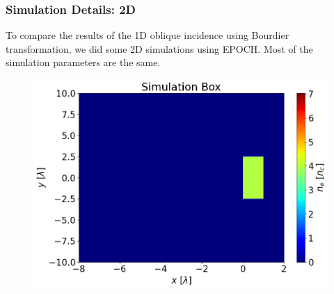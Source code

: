 \documentclass{beamer}
\begin{document}
\begin{frame}
    \frametitle{Simulation Details: 2D}
    \small
    To compare the results of the 1D oblique incidence using Bourdier transformation, we did some 2D simulations using EPOCH. Most of the simulation parameters are the same.
    \begin{minipage}[t]{0.64\linewidth}
        \begin{figure}
            \centering
            \includegraphics[width=1.0\textwidth, height=0.62\textheight]{images/2dbox.png}
            \label{fig:2dbox}
        \end{figure}
    \end{minipage}

\end{frame}
\end{document}
